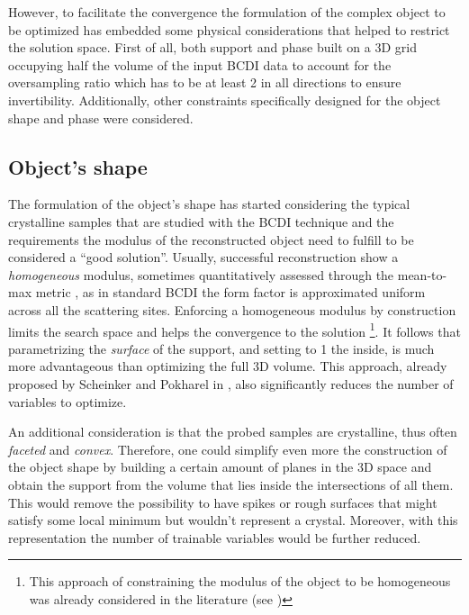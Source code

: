 However, to facilitate the convergence the formulation of the complex object to be optimized has embedded some physical considerations that 
helped to restrict the solution space. First of all, both support and phase built on a 3D grid occupying half the volume of the 
input BCDI data to account for the oversampling ratio which has to be at least 2 in all directions to ensure invertibility.  
Additionally, other constraints specifically designed for the object shape and phase were considered. 

\subsection{Object's shape}

The formulation of the object's shape has started considering the typical crystalline samples that are studied with the BCDI technique
and the requirements the modulus of the reconstructed object need to fulfill to be considered a ``good solution''. 
Usually, successful reconstruction show a \textit{homogeneous} modulus, sometimes quantitatively assessed through the 
mean-to-max metric \cite{Frisch2023CuAgCatalysts, Grimes2024CatalystStrain}, as in standard BCDI the form factor is 
approximated uniform across all the scattering sites. Enforcing a homogeneous modulus by construction limits the search space 
and helps the convergence to the solution \footnote{This approach of constraining the modulus of the object to be homogeneous was already 
considered in the literature (see \cite{Minkevich2007_virginie, Minkevich2008_baumbach, Madsen2021})}.
It follows that parametrizing the \textit{surface} of the support, and setting to 1 the inside, is much more advantageous than optimizing 
the full 3D volume. This approach, already proposed by Scheinker and Pokharel in \cite{scheinker_adaptive_2020}, 
also significantly reduces the number of variables to optimize.

An additional consideration is that the probed samples are crystalline, thus often \textit{faceted} and \textit{convex}. 
Therefore, one could simplify even more the construction of the object shape by building a certain amount of planes in the 
3D space and obtain the support from the volume that lies inside the intersections of all them. This would remove the possibility 
to have spikes or rough surfaces that might satisfy some local minimum but wouldn't represent a crystal. Moreover, with this 
representation the number of trainable variables would be further reduced. 

